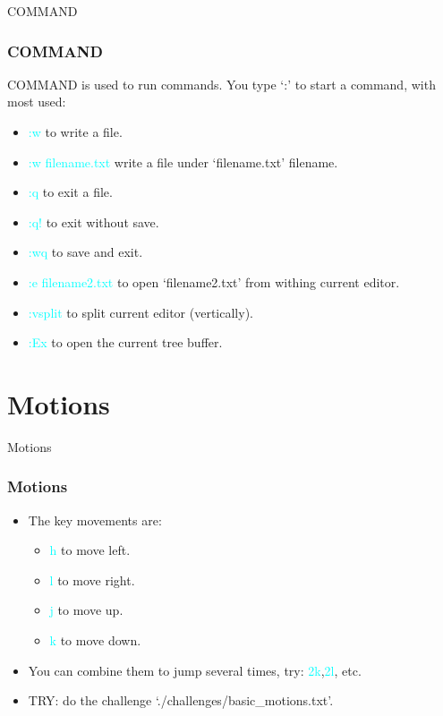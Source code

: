 \documentclass{beamer}
\newcommand{\highlight}[1]{\textcolor{cyan}{\textsf{#1}}}
\begin{document}
\begin{frame}{COMMAND}
    \frametitle{COMMAND}
    COMMAND is used to run commands.
    You type `:' to start a command, with most used:
    \begin{itemize}
        \item \highlight{:w} to write a file.
        \item \highlight{:w filename.txt} write a file under `filename.txt' filename.
        \item \highlight{:q} to exit a file.
        \item \highlight{:q!} to exit without save.
        \item \highlight{:wq} to save and exit.
        \item \highlight{:e filename2.txt} to open `filename2.txt' from withing current editor.
        \item \highlight{:vsplit} to split current editor (vertically).
        \item \highlight{:Ex} to open the current tree buffer.
    \end{itemize}
\end{frame}

\section{Motions}
\begin{frame}{Motions}
    \frametitle{Motions}
    \begin{itemize}
        \item The key movements are:
            \begin{itemize}
                \item \highlight{h} to move left.
                \item \highlight{l} to move right.
                \item \highlight{j} to move up. 
                \item \highlight{k} to move down.
            \end{itemize}
        \item You can combine them to jump several times, try: \highlight{2k},\highlight{2l}, etc.
        \item TRY: do the challenge `./challenges/basic\_motions.txt'.
    \end{itemize}
\end{frame}
\end{document}
